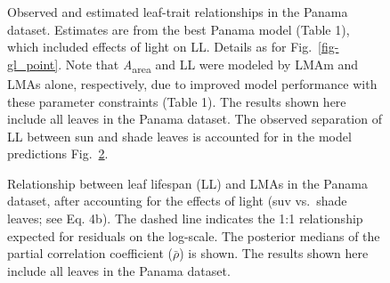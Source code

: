 \documentclass[
  12pt,
  letterpaper,
  DIV=11,
  numbers=noendperiod]{scrartcl}
\begin{document}
\newpage

\begin{figure}


\caption{\label{fig-pa_point}Observed and estimated leaf-trait
relationships in the Panama dataset. Estimates are from the best Panama
model (Table 1), which included effects of light on LL. Details as for
Fig.~\ref{fig-gl_point}. Note that \emph{A}\textsubscript{area} and LL
were modeled by LMAm and LMAs alone, respectively, due to improved model
performance with these parameter constraints (Table 1). The results
shown here include all leaves in the Panama dataset. The observed
separation of LL between sun and shade leaves is accounted for in the
model predictions Fig.~\ref{fig-ll_point}.}

\end{figure}%

\newpage

\begin{figure}


\caption{\label{fig-ll_point}Relationship between leaf lifespan (LL) and
LMAs in the Panama dataset, after accounting for the effects of light
(suv vs.~shade leaves; see Eq. 4b). The dashed line indicates the 1:1
relationship expected for residuals on the log-scale. The posterior
medians of the partial correlation coefficient (\(\bar{\rho}\)) is
shown. The results shown here include all leaves in the Panama dataset.}

\end{figure}%
\end{document}
